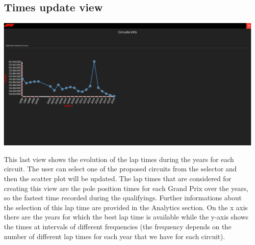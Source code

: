 \documentclass[11pt,twocolumn,letterpaper]{article}
\begin{document}
\subsection{Times update view}
\begin{center}
	\centering
	\includegraphics[width=\columnwidth]{timesupdate}
\end{center}
This last view shows the evolution of the lap times during the years for each circuit. The user can select one of the proposed circuits from the selector and then the scatter
plot will be updated. The lap times that are considered for creating this view are the pole position times for each Grand Prix over the years, so the fastest time
recorded during the qualifyings. Further informations about the selection of this lap time are provided in the Analytics section. On the x axis there are the years for which the
best lap time is available while the y-axis shows the times at intervals of different frequencies (the frequency depends on the number of different lap times for each year that
we have for each circuit).
\end{document}
